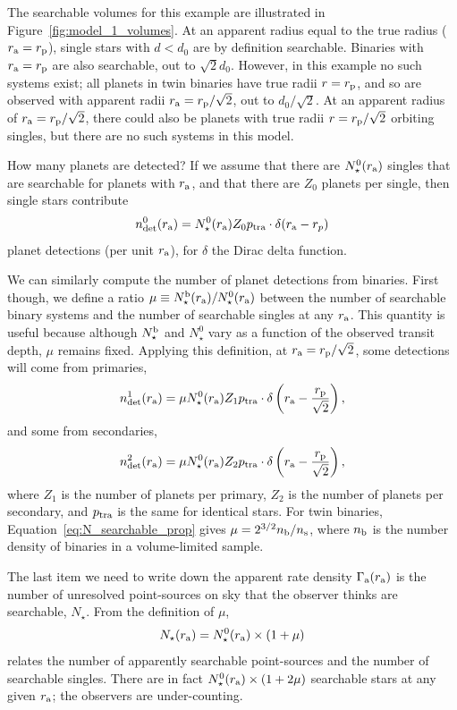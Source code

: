\documentclass[12pt,modern]{aastex61}
\renewcommand{\a}{_{\rm a}}
\newcommand{\p}{_{\rm p}}
\begin{document}
The searchable volumes for this example are illustrated in 
Figure~\ref{fig:model_1_volumes}.
At an apparent radius equal to the true radius ($r\a=r\p$), single stars 
with $d<d_0$ are by definition searchable.
Binaries with $r\a=r\p$ are also searchable, out to $\sqrt{2}d_0$. 
However, in this example no such systems exist; all planets in twin binaries 
have true radii $r=r\p$, and so are observed with apparent radii 
$r\a=r\p/\sqrt{2}$, out to $d_0/\sqrt{2}$.
At an apparent radius of $r\a=r\p/\sqrt{2}$, there could also be planets with 
true radii $r=r\p/\sqrt{2}$ orbiting singles, but there are no such systems 
in this model.

How many planets are detected?
If we assume that there are $N_\star^0(r\a)$ singles that are searchable for 
planets with $r\a$, and that there are $Z_0$ planets per single, then 
single stars contribute
\begin{equation}
n_{\rm det}^0(r\a) = N_\star^0(r\a) Z_0 p_{\rm tra} \cdot \delta(r\a - r_p)
\end{equation}
planet detections (per unit $r\a$), for $\delta$ the Dirac delta function.

We can similarly compute the number of planet detections from binaries.
First though, we define a ratio $\mu \equiv N_\star^{\rm b}(r\a) / 
N_\star^0(r\a)$ 
between the number of searchable binary systems and the number of searchable 
singles at any $r\a$.
This quantity is useful because although $N_\star^{\rm b}$ and $N_\star^0$ vary
as a function of the observed transit depth, $\mu$ remains fixed.
Applying this definition, at $r\a=r\p/\sqrt{2}$, some detections will come 
from primaries,
\begin{equation}
n_{\rm det}^1(r\a) =
\mu N_\star^0(r\a) Z_1 p_{\rm tra}
\cdot \delta\left(r\a - \frac{r\p}{\sqrt{2}}\right),
\end{equation}
and some from secondaries,
\begin{equation}
n_{\rm det}^2(r\a) = 
\mu N_\star^0(r\a) Z_2 p_{\rm tra}
\cdot \delta\left(r\a - \frac{r\p}{\sqrt{2}}\right),
\end{equation}
where $Z_1$ is the number of planets per primary, $Z_2$ is the number of 
planets per secondary, and $p_{\rm tra}$ is the same for identical stars.
For twin binaries, Equation~\ref{eq:N_searchable_prop} gives $\mu = 
2^{3/2} n_{\rm b}/n_{\rm s}$, where $n_{\rm b}$ is the number density of 
binaries in a volume-limited sample.

The last item we need to write down the apparent rate density $\Gamma\a(r\a)$ 
is the number of unresolved point-sources on sky that the observer thinks are 
searchable, $N_\star$.
From the definition of $\mu$,
\begin{equation}
N_\star(r\a) = N_\star^0(r\a) \times (1 + \mu)
\label{eq:apparentlysearchable_to_searchable}
\end{equation}
relates the number of apparently searchable point-sources and the number of 
searchable singles.
There are in fact $N_\star^0(r\a)\times (1 + 2\mu)$ searchable stars
at any given $r\a$; the observers are under-counting.
\end{document}
